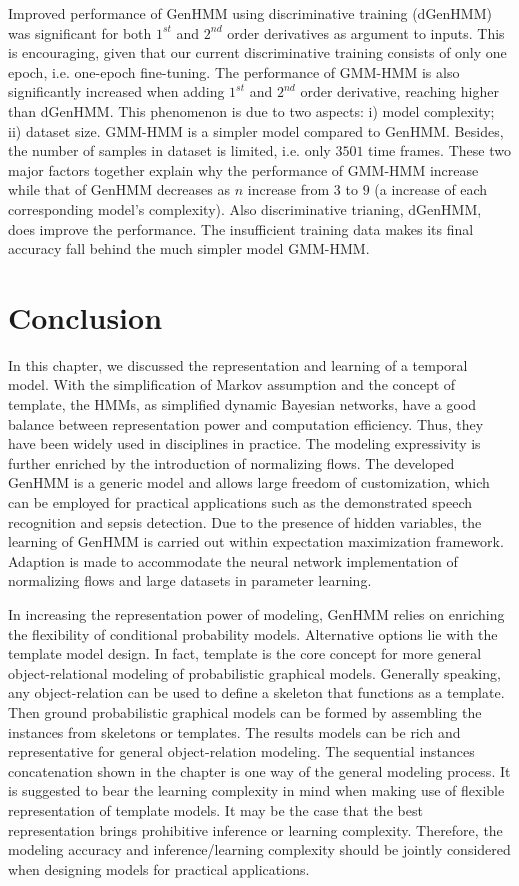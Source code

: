 Improved performance of GenHMM using discriminative training (dGenHMM) was significant for both $1^{st}$ and $2^{nd}$ order derivatives as argument to inputs.
This is encouraging, given that our current discriminative training consists of only one epoch, i.e. one-epoch fine-tuning.
The performance of GMM-HMM is also significantly increased when adding $1^{st}$ and $2^{nd}$ order derivative, reaching higher than dGenHMM.
This phenomenon is due to two aspects: i) model complexity; ii) dataset size. GMM-HMM is a simpler model compared to GenHMM. Besides, the number of samples in dataset is limited, i.e. only $3501$ time frames. These two major factors together explain why the performance of GMM-HMM increase while that of GenHMM decreases as $n$ increase from $3$ to $9$ (a increase of each corresponding model's complexity).
Also discriminative trianing, dGenHMM, does improve the performance. The insufficient training data makes its final accuracy fall behind the much simpler model GMM-HMM.

\section{Conclusion}
In this chapter, we discussed the representation and learning of a temporal model. With the simplification of Markov assumption and the concept of template, the HMMs, as simplified dynamic Bayesian networks, have a good balance between representation power and computation efficiency. Thus, they have been widely used in disciplines in practice. The modeling expressivity is further enriched by the introduction of normalizing flows. The developed GenHMM is a generic model and allows large freedom of customization, which can be employed for practical applications such as the demonstrated speech recognition and sepsis detection. Due to the presence of hidden variables, the learning of GenHMM is carried out within expectation maximization framework. Adaption is made to accommodate the neural network implementation of normalizing flows and large datasets in parameter learning.

In increasing the representation power of modeling, GenHMM relies on enriching the flexibility of conditional probability models. Alternative options lie with the template model design. In fact, template is the core concept for more general object-relational modeling of probabilistic graphical models. Generally speaking, any object-relation can be used to define a skeleton that functions as a template. Then ground probabilistic graphical models can be formed by assembling the instances from skeletons or templates. The results models can be rich and representative for general object-relation modeling. The sequential instances concatenation shown in the chapter is one way of the general modeling process. It is suggested to bear the learning complexity in mind when making use of flexible representation of template models. It may be the case that the best representation brings prohibitive inference or learning complexity. Therefore, the modeling accuracy and inference/learning complexity should be jointly considered when designing models for practical applications.


